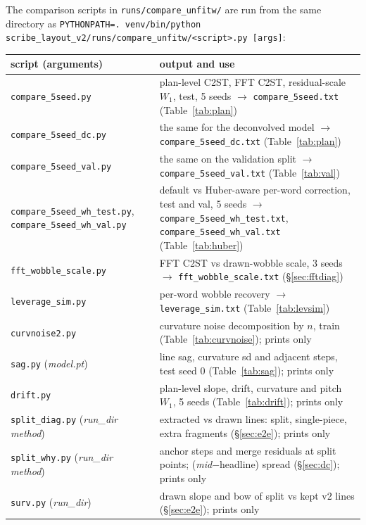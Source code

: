 \documentclass[11pt,a4paper]{article}
\begin{document}
The comparison scripts in \texttt{runs/compare\_unfitw/} are run from the
same directory as
\texttt{PYTHONPATH=. venv/bin/python scribe\_layout\_v2/runs/compare\_unfitw/<script>.py [args]}:
\begin{center}\small
\begin{tabular}{p{5.3cm}p{9.9cm}}
\toprule
script (arguments) & output and use\\
\midrule
\texttt{compare\_5seed.py} & plan-level C2ST, FFT C2ST, residual-scale $W_1$, test, 5 seeds $\to$ \texttt{compare\_5seed.txt} (Table~\ref{tab:plan})\\
\texttt{compare\_5seed\_dc.py} & the same for the deconvolved model $\to$ \texttt{compare\_5seed\_dc.txt} (Table~\ref{tab:plan})\\
\texttt{compare\_5seed\_val.py} & the same on the validation split $\to$ \texttt{compare\_5seed\_val.txt} (Table~\ref{tab:val})\\
\texttt{compare\_5seed\_wh\_test.py}, \texttt{compare\_5seed\_wh\_val.py} & default vs Huber-aware per-word correction, test and val, 5 seeds $\to$ \texttt{compare\_5seed\_wh\_test.txt}, \texttt{compare\_5seed\_wh\_val.txt} (Table~\ref{tab:huber})\\
\texttt{fft\_wobble\_scale.py} & FFT C2ST vs drawn-wobble scale, 3 seeds $\to$ \texttt{fft\_wobble\_scale.txt} (\S\ref{sec:fftdiag})\\
\texttt{leverage\_sim.py} & per-word wobble recovery $\to$ \texttt{leverage\_sim.txt} (Table~\ref{tab:levsim})\\
\texttt{curvnoise2.py} & curvature noise decomposition by $n$, train (Table~\ref{tab:curvnoise}); prints only\\
\texttt{sag.py} (\textit{model.pt}) & line sag, curvature sd and adjacent steps, test seed 0 (Table~\ref{tab:sag}); prints only\\
\texttt{drift.py} & plan-level slope, drift, curvature and pitch $W_1$, 5 seeds (Table~\ref{tab:drift}); prints only\\
\texttt{split\_diag.py} (\textit{run\_dir method}) & extracted vs drawn lines: split, single-piece, extra fragments (\S\ref{sec:e2e}); prints only\\
\texttt{split\_why.py} (\textit{run\_dir method}) & anchor steps and merge residuals at split points; (\textit{mid}$-$headline) spread (\S\ref{sec:dc}); prints only\\
\texttt{surv.py} (\textit{run\_dir}) & drawn slope and bow of split vs kept v2 lines (\S\ref{sec:e2e}); prints only\\
\bottomrule
\end{tabular}
\end{center}
\end{document}
